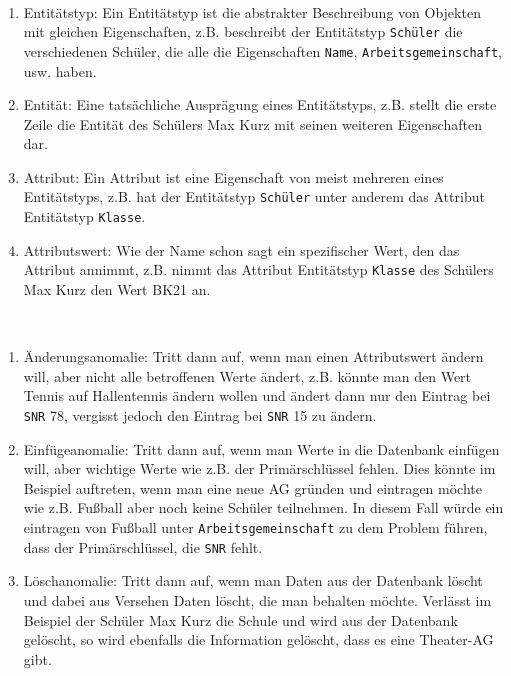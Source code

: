 \documentclass[a4paper,12pt, headsepline, ngerman]{scrartcl}
\begin{document}
	\begin{Answer}[ref=KABegriffeDefinieren]\\
		\begin{enumerate}
			\item Entitätstyp: Ein Entitätstyp ist die abstrakter Beschreibung von Objekten mit gleichen Eigenschaften, z.B. beschreibt der Entitätstyp \lstinline!Schüler! die verschiedenen Schüler, die alle die Eigenschaften \lstinline!Name!, \lstinline!Arbeitsgemeinschaft!, usw. haben.
			\item Entität: Eine tatsächliche Ausprägung eines Entitätstyps, z.B. stellt die erste Zeile die Entität des Schülers Max Kurz mit seinen weiteren Eigenschaften dar.
			\item Attribut: Ein Attribut ist eine Eigenschaft von meist mehreren eines Entitätstyps, z.B. hat der Entitätstyp \lstinline!Schüler! unter anderem  das Attribut Entitätstyp \lstinline!Klasse!.
			\item Attributswert: Wie der Name schon sagt ein spezifischer Wert, den das Attribut annimmt, z.B. nimmt das Attribut Entitätstyp \lstinline!Klasse! des Schülers Max Kurz den Wert BK21 an.
		\end{enumerate}
	\end{Answer}
	\begin{Answer}[ref=KAAnomalien]\\
		\begin{enumerate}
			\item Änderungsanomalie: Tritt dann auf, wenn man einen Attributswert ändern will, aber nicht alle betroffenen Werte ändert, z.B. könnte man den Wert Tennis auf Hallentennis ändern wollen und ändert dann nur den Eintrag bei \lstinline!SNR! 78, vergisst jedoch den Eintrag bei \lstinline!SNR! 15 zu ändern.
			\item Einfügeanomalie: Tritt dann auf, wenn man Werte in die Datenbank einfügen will, aber wichtige Werte wie z.B. der Primärschlüssel fehlen. Dies könnte im Beispiel auftreten, wenn man eine neue AG gründen und eintragen möchte wie z.B. Fußball aber noch keine Schüler teilnehmen. In diesem Fall würde ein eintragen von Fußball unter \lstinline!Arbeitsgemeinschaft! zu dem Problem führen, dass der Primärschlüssel, die \lstinline!SNR! fehlt.
			\item Löschanomalie: Tritt dann auf, wenn man Daten aus der Datenbank löscht und dabei aus Versehen Daten löscht, die man behalten möchte. Verlässt im Beispiel der Schüler Max Kurz die Schule und wird aus der Datenbank gelöscht, so wird ebenfalls die Information gelöscht, dass es eine Theater-AG gibt.
		\end{enumerate}
		
		
	\end{Answer}
\end{document}
